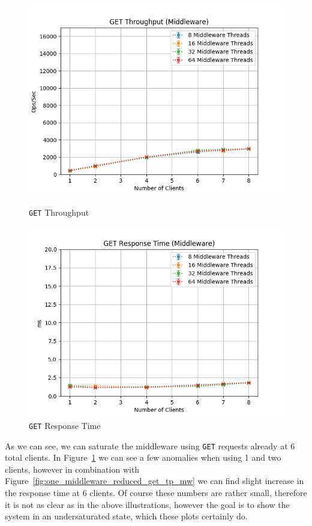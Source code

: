 \documentclass[11pt,a4paper]{article}
\begin{document}
\begin{figure}[H]
	\centering
	\captionsetup{width=0.4\textwidth}
    \begin{minipage}{0.5\textwidth}
        \centering
        \includegraphics[width=\textwidth]{../illustrations/plots/2_1_1_one_middleware_reduced/0-1/middleware_get_tp_s.png}
        \caption{\texttt{GET} Throughput}
        \label{fig:one_middleware_reduced_get_tp_mw}
    \end{minipage}\hfill
    \begin{minipage}{0.5\textwidth}
        \centering
        \includegraphics[width=\textwidth]{../illustrations/plots/2_1_1_one_middleware_reduced/0-1/middleware_get_rt_ms.png}
        \caption{\texttt{GET} Response Time}
        \label{fig:one_middleware_reduced_get_rt_mw}
    \end{minipage}
\end{figure}
%
As we can see, we can saturate the middleware using \texttt{GET} requests already at 6 total clients.
%
In Figure~\ref{fig:one_middleware_reduced_get_rt_mw} we can see a few anomalies when using 1 and two clients, however in combination with Figure~\ref{fig:one_middleware_reduced_get_tp_mw} we can find slight increase in the response time at 6 clients.
%
Of course these numbers are rather small, therefore it is not as clear as in the above illustrations, however the goal is to show the system in an undersaturated state, which these plots certainly do.
%
\end{document}
